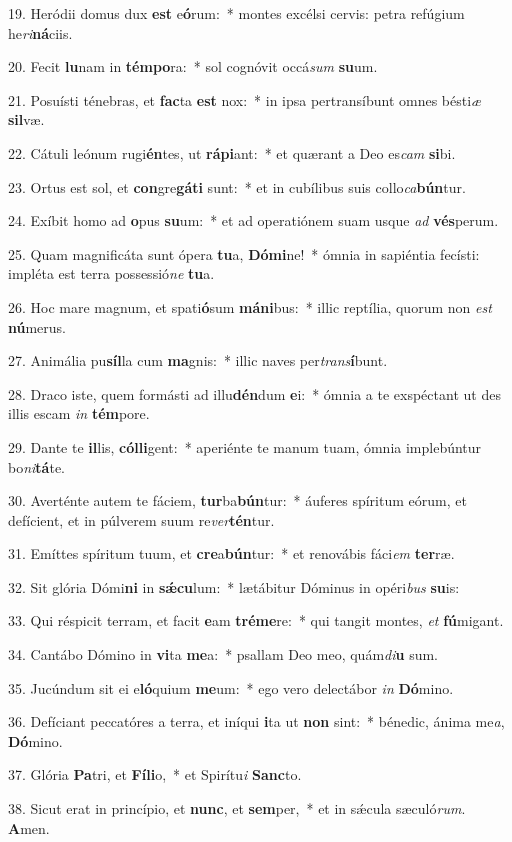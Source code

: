 19. Heródii domus dux \textbf{est} e\textbf{ó}rum:~*  montes excélsi cervis: petra refúgium he\textit{ri}\textbf{ná}ciis.\

20. Fecit \textbf{lu}nam in \textbf{tém}\textbf{po}ra:~*  sol cognóvit occá\textit{sum} \textbf{su}um.\

21. Posuísti ténebras, et \textbf{fac}ta \textbf{est} nox:~*  in ipsa pertransíbunt omnes bésti\textit{æ} \textbf{sil}væ.\

22. Cátuli leónum rugi\textbf{én}tes, ut \textbf{rá}\textbf{pi}ant:~*  et quærant a Deo es\textit{cam} \textbf{si}bi.\

23. Ortus est sol, et \textbf{con}gre\textbf{gá}\textbf{ti} sunt:~*  et in cubílibus suis collo\textit{ca}\textbf{bún}tur.\

24. Exíbit homo ad \textbf{o}pus \textbf{su}um:~*  et ad operatiónem suam usque \textit{ad} \textbf{vés}perum.\

25. Quam magnificáta sunt ópera \textbf{tu}a, \textbf{Dó}\textbf{mi}ne!~*  ómnia in sapiéntia fecísti: impléta est terra possessió\textit{ne} \textbf{tu}a.\

26. Hoc mare magnum, et spati\textbf{ó}sum \textbf{má}\textbf{ni}bus:~*  illic reptília, quorum non \textit{est} \textbf{nú}merus.\

27. Animália pu\textbf{síl}la cum \textbf{ma}gnis:~*  illic naves per\textit{trans}\textbf{í}bunt.\

28. Draco iste, quem formásti ad illu\textbf{dén}dum \textbf{e}i:~*  ómnia a te exspéctant ut des illis escam \textit{in} \textbf{tém}pore.\

29. Dante te \textbf{il}lis, \textbf{cól}\textbf{li}gent:~*  aperiénte te manum tuam, ómnia implebúntur bo\textit{ni}\textbf{tá}te.\

30. Averténte autem te fáciem, \textbf{tur}ba\textbf{bún}tur:~*  áuferes spíritum eórum, et defícient, et in púlverem suum re\textit{ver}\textbf{tén}tur.\

31. Emíttes spíritum tuum, et \textbf{cre}a\textbf{bún}tur:~*  et renovábis fáci\textit{em} \textbf{ter}ræ.\

32. Sit glória Dómi\textbf{ni} in \textbf{sǽ}\textbf{cu}lum:~*  lætábitur Dóminus in opéri\textit{bus} \textbf{su}is:\

33. Qui réspicit terram, et facit \textbf{e}am \textbf{tré}\textbf{me}re:~*  qui tangit montes, \textit{et} \textbf{fú}migant.\

34. Cantábo Dómino in \textbf{vi}ta \textbf{me}a:~*  psallam Deo meo, quám\textit{di}\textbf{u} sum.\

35. Jucúndum sit ei e\textbf{ló}quium \textbf{me}um:~*  ego vero delectábor \textit{in} \textbf{Dó}mino.\

36. Defíciant peccatóres a terra, et iníqui \textbf{i}ta ut \textbf{non} sint:~*  bénedic, ánima me\textit{a}, \textbf{Dó}mino.\

37. Glória \textbf{Pa}tri, et \textbf{Fí}\textbf{li}o,~*  et Spirítu\textit{i} \textbf{Sanc}to.\

38. Sicut erat in princípio, et \textbf{nunc}, et \textbf{sem}per,~*  et in sǽcula sæculó\textit{rum}. \textbf{A}men.\

